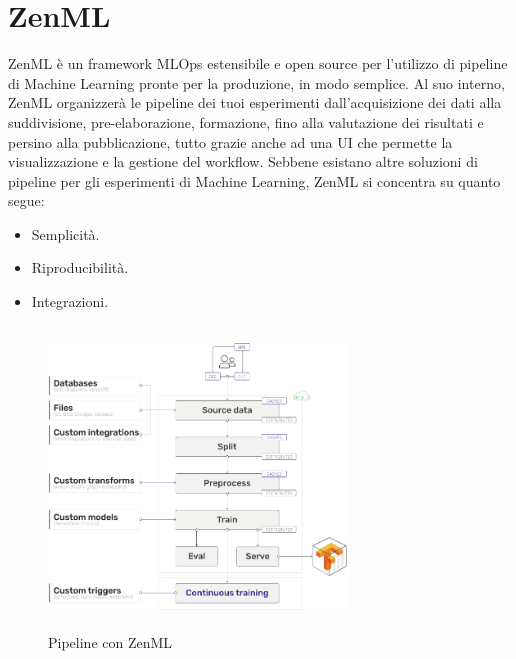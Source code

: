 \documentclass[12pt,a4paper]{report}
\begin{document}
\section{ZenML}
ZenML è un framework MLOps estensibile e open source per l'utilizzo di pipeline di Machine Learning pronte per la produzione, in modo semplice. Al suo interno, ZenML organizzerà le pipeline dei tuoi esperimenti dall'acquisizione dei dati alla suddivisione, pre-elaborazione, formazione, fino alla valutazione dei risultati e persino alla pubblicazione, tutto grazie anche ad una UI che permette la visualizzazione e la gestione del workflow. \cite{ZenML}
Sebbene esistano altre soluzioni di pipeline per gli esperimenti di Machine Learning, ZenML si concentra su quanto segue:
\begin{itemize}
    \item Semplicità.
    \item Riproducibilità.
    \item Integrazioni.
\end{itemize}

\begin{figure}[h!]
    \begin{center}
        \includegraphics[width=8cm,height=8cm,keepaspectratio]{ZenML-schema}
    \end{center}
    \caption{Pipeline con ZenML}
    \label{fig:ZenML-schema}
\end{figure}
\end{document}
